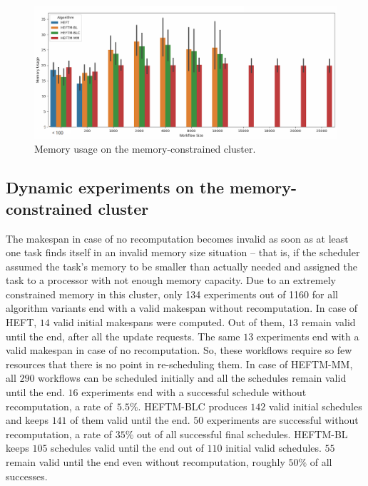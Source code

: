 \documentclass[conference]{IEEEtran}
\newcommand{\algo}[1]{\textsc{#1}}
\newcommand{\heft}{\algo{HEFT}\xspace}
\newcommand{\heftmm}{\algo{HEFTM-MM}\xspace}
\newcommand{\heftbl}{\algo{HEFTM-BL}\xspace}
\newcommand{\heftblc}{\algo{HEFTM-BLC}\xspace}
\newcommand{\AB}[1]{{\color{purple}[AB: #1]}}
\begin{document}
\begin{figure}[tb]
    \centering
    \includegraphics[width=1\columnwidth] {images/mem-usage-constrained-onlyvalid2}
    \caption{Memory usage on the memory-constrained  cluster. } %
    \label{fig:memory-usage-constrained}
    \vspace{-0.15cm}
\end{figure}


    
\subsection{Dynamic experiments on the memory-constrained cluster}
\label{sec.expe.dyn}

%
The makespan in case of no recomputation becomes invalid as soon as at least one task finds itself in an invalid memory size
situation -- that is, if the scheduler assumed the task's memory to be smaller than actually needed and
assigned the task to a processor with not enough memory capacity.
Due to an extremely constrained memory in this cluster, only 134 experiments out of 1160 
for all algorithm variants end with a valid makespan without recomputation.
In case of \heft, $14$ valid initial makespans were computed.
Out of them, $13$ remain valid until the end, after all the update requests.
The same $13$ experiments end with a valid makespan in case of no recomputation.
So, these workflows require so few resources that there is no point in re-scheduling them.
In case of \heftmm, all $290$ workflows can be scheduled initially and all the schedules remain valid until the end.
$16$ experiments end with a successful schedule without recomputation, a rate of~$5.5\%$.
\heftblc produces $142$ valid initial schedules and keeps $141$ of them valid until the end.
$50$ experiments are successful without recomputation, a rate of $35\%$ out of all successful final schedules.
\heftbl keeps $105$ schedules valid until the end out of $110$ initial valid schedules.
$55$ remain valid until the end even without recomputation, roughly $50\%$ of all successes.
\end{document}
